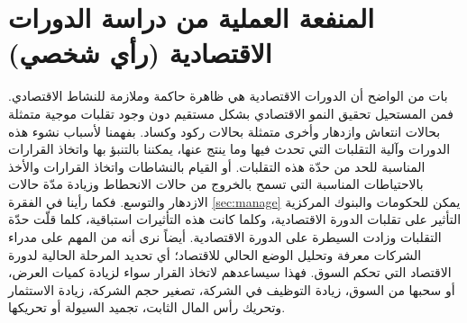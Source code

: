 \section{المنفعة العملية من دراسة الدورات الاقتصادية (رأي شخصي)}
بات من الواضح أن الدورات الاقتصادية هي ظاهرة حاكمة وملازمة للنشاط الاقتصادي. فمن المستحيل تحقيق النمو الاقتصادي بشكل مستقيم دون وجود تقلبات موجية متمثلة بحالات
انتعاش وازدهار وأخرى متمثلة بحالات ركود وكساد. بفهمنا لأسباب نشوء هذه الدورات وآلية التقلبات التي تحدث فيها وما ينتج عنها، يمكننا بالتنبؤ بها واتخاذ القرارات المناسبة للحد
من حدّة هذه التقلبات. أو القيام بالنشاطات واتخاذ القرارات والأخذ بالاحتياطات المناسبة التي تسمح بالخروج من حالات الانحطاط وزيادة مدّة حالات الازدهار والتوسع.
فكما رأينا في الفقرة \ref{sec:manage} يمكن للحكومات والبنوك المركزية التأثير على تقلبات الدورة الاقتصادية، وكلما كانت هذه التأثيرات استباقية، كلما قلّت حدّة التقلبات
وزادت السيطرة على الدورة الاقتصادية.
أيضاً نرى أنه من المهم على مدراء الشركات معرفة وتحليل الوضع الحالي للاقتصاد؛ أي تحديد المرحلة الحالية لدورة الاقتصاد التي تحكم السوق. فهذا سيساعدهم لاتخاذ القرار
سواء لزيادة كميات العرض، أو سحبها من السوق، زيادة التوظيف في الشركة، تصغير حجم الشركة، زيادة الاستثمار وتحريك رأس المال الثابت، تجميد السيولة أو تحريكها.




